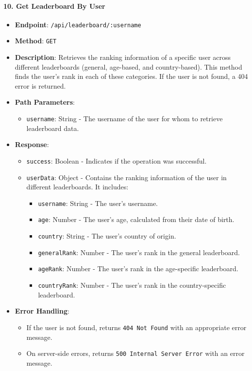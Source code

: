 \hypertarget{get-leaderboard-by-user}{%
\paragraph{10. Get Leaderboard By User}\label{get-leaderboard-by-user}}

\begin{itemize}
\tightlist
\item
  \textbf{Endpoint}: \texttt{/api/leaderboard/:username}
\item
  \textbf{Method}: \texttt{GET}
\item
  \textbf{Description}: Retrieves the ranking information of a specific
  user across different leaderboards (general, age-based, and
  country-based). This method finds the user's rank in each of these
  categories. If the user is not found, a 404 error is returned.
\item
  \textbf{Path Parameters}:

  \begin{itemize}
  \tightlist
  \item
    \texttt{username}: String - The username of the user for whom to
    retrieve leaderboard data.
  \end{itemize}
\item
  \textbf{Response}:

  \begin{itemize}
  \tightlist
  \item
    \texttt{success}: Boolean - Indicates if the operation was
    successful.
  \item
    \texttt{userData}: Object - Contains the ranking information of the
    user in different leaderboards. It includes:

    \begin{itemize}
    \tightlist
    \item
      \texttt{username}: String - The user's username.
    \item
      \texttt{age}: Number - The user's age, calculated from their date
      of birth.
    \item
      \texttt{country}: String - The user's country of origin.
    \item
      \texttt{generalRank}: Number - The user's rank in the general
      leaderboard.
    \item
      \texttt{ageRank}: Number - The user's rank in the age-specific
      leaderboard.
    \item
      \texttt{countryRank}: Number - The user's rank in the
      country-specific leaderboard.
    \end{itemize}
  \end{itemize}
\item
  \textbf{Error Handling}:

  \begin{itemize}
  \tightlist
  \item
    If the user is not found, returns \texttt{404\ Not\ Found} with an
    appropriate error message.
  \item
    On server-side errors, returns \texttt{500\ Internal\ Server\ Error}
    with an error message.
  \end{itemize}
\end{itemize}

